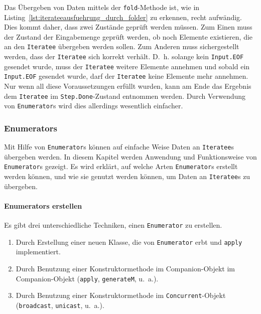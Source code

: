 \documentclass[draft=false
              ,paper=a4
              ,twoside=false
              ,fontsize=11pt
              ,headsepline
              ,BCOR10mm
              ,DIV11
              ]{scrbook}
\begin{document}
Das Übergeben von Daten mittels der \lstinline|fold|-Methode ist, wie in Listing~\ref{lst:iterateeausfuehrung_durch_folder} zu erkennen, recht aufwändig.
Dies kommt daher, dass zwei Zustände geprüft werden müssen.
Zum Einen muss der Zustand der Eingabemenge geprüft werden, ob noch Elemente existieren, die an den \lstinline|Iteratee| übergeben werden sollen.
Zum Anderen muss sichergestellt werden, dass der \lstinline|Iteratee| sich korrekt verhält.
D.~h. solange kein \lstinline|Input.EOF| gesendet wurde, muss der \lstinline|Iteratee| weitere Elemente annehmen und sobald ein \lstinline|Input.EOF| gesendet wurde, darf der \lstinline|Iteratee| keine Elemente mehr annehmen.
Nur wenn all diese Voraussetzungen erfüllt wurden, kann am Ende das Ergebnis dem \lstinline|Iteratee| im \lstinline|Step.Done|-Zustand entnommen werden.
Durch Verwendung von \lstinline|Enumerator|s wird dies allerdings wesentlich einfacher.



\subsubsection{Enumerators} %
\label{ssub:enumerators}

Mit Hilfe von \lstinline|Enumerator|s können auf einfache Weise Daten an \lstinline|Iteratee|s übergeben werden.
In diesem Kapitel werden Anwendung und Funktionsweise von \lstinline|Enumerator|s gezeigt.
Es wird erklärt, auf welche Arten \lstinline|Enumerator|s erstellt werden können, und wie sie genutzt werden können, um Daten an \lstinline|Iteratee|s zu übergeben.

\paragraph{Enumerators erstellen} %
\label{par:enumerators_erstellen}\mbox{} %

Es gibt drei unterschiedliche Techniken, einen \lstinline|Enumerator| zu erstellen.
\begin{enumerate}
  \item Durch Erstellung einer neuen Klasse, die von \lstinline|Enumerator| erbt und \lstinline|apply| implementiert.
  \item Durch Benutzung einer Konstruktormethode im Companion-Objekt im Companion-Objekt (\lstinline|apply|, \lstinline|generateM|, u.~a.).
  \item Durch Benutzung einer Konstruktormethode im \lstinline|Concurrent|-Objekt (\lstinline|broadcast|, \lstinline|unicast|, u.~a.).
\end{enumerate}
\end{document}
